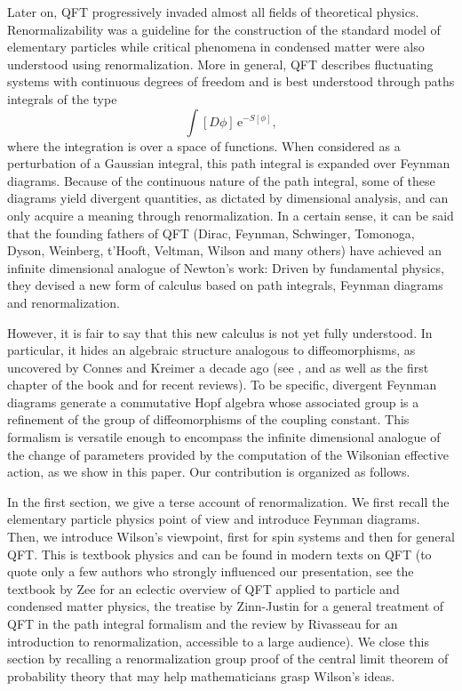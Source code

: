 \documentclass[12pt,here,feynmf]{article}
\begin{document}
Later on, QFT progressively invaded almost all fields of theoretical physics.  Renormalizability was a guideline for the construction of the standard model of elementary particles while critical phenomena in condensed matter were also understood using renormalization. More in general, QFT describes fluctuating systems with continuous degrees of freedom and is best understood through paths integrals of the type
\begin{equation}
\int[D\phi]\,\mathrm{e}^{-S[\phi]},
\end{equation}
where the integration is over a space of functions. When considered as a perturbation of a Gaussian  integral, this path integral is expanded over Feynman diagrams. Because of the continuous nature of the path integral, some of these diagrams yield divergent quantities, as dictated by dimensional analysis, and can only acquire a meaning through renormalization. In a certain sense, it can be said that the founding fathers of QFT (Dirac, Feynman,  Schwinger, Tomonoga, Dyson, Weinberg, t'Hooft, Veltman, Wilson and many others) have achieved an infinite dimensional analogue of Newton's work: Driven by fundamental physics, they devised a new form of calculus based on path integrals, Feynman diagrams and renormalization.


However, it is fair to say that this new calculus is not yet fully understood. In particular, it hides an algebraic structure analogous to diffeomorphisms, as uncovered by Connes and Kreimer a decade ago (see \cite{ck0}, \cite{ck1} and \cite{ck2} as well as the first chapter of the book \cite{connesmarcolli} and \cite{kk} for recent reviews). To be specific, divergent Feynman diagrams generate a commutative Hopf algebra whose associated group is a refinement of the group of diffeomorphisms of the coupling constant. This formalism is versatile enough to encompass the infinite dimensional analogue of the change of parameters provided by the computation of the Wilsonian effective action, as we show in this paper. Our contribution is organized as follows.

In the first section, we give a terse account of renormalization. We first recall the elementary particle physics point of view and introduce Feynman diagrams. Then, we introduce Wilson's viewpoint, first for spin systems and then for general QFT. This is textbook physics and can be found in modern texts on QFT (to quote only a few authors who strongly influenced our presentation, see the textbook \cite{zee}  by Zee for an eclectic overview of QFT applied to particle and condensed matter physics, the treatise by Zinn-Justin \cite{zinn} for a general treatment of QFT in the path integral formalism  and the review by Rivasseau \cite{Rivasseau} for an introduction to renormalization, accessible to a large audience). We close this section by recalling a renormalization group proof of the central limit theorem of probability theory that may help mathematicians grasp Wilson's ideas.
\end{document}
